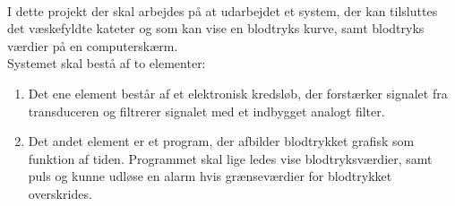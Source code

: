 \\  
I dette projekt der skal arbejdes på at udarbejdet et system, der kan tilsluttes det væskefyldte kateter og som kan vise en blodtryks kurve, samt blodtryks værdier på en computerskærm. \\
Systemet skal bestå af to elementer:
\begin{enumerate}
	\item Det ene element består af et elektronisk kredsløb, der forstærker signalet fra transduceren og filtrerer signalet med et indbygget analogt filter.
	\item Det andet element er et program, der afbilder blodtrykket grafisk som funktion af tiden. Programmet skal lige ledes vise blodtryksværdier, samt puls og kunne udløse en alarm hvis grænseværdier for blodtrykket overskrides. 
\end{enumerate}



  
